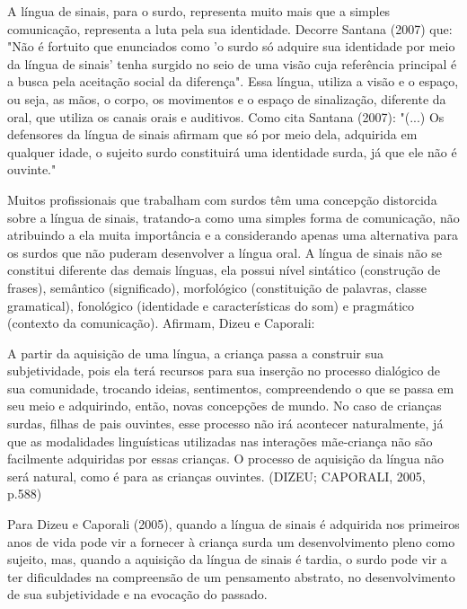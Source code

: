 \documentclass[brasil]{abnt}
\begin{document}
		A língua de sinais, para o surdo, representa muito mais que a simples comunicação, representa a luta pela sua identidade. Decorre Santana (2007) que: "Não é fortuito que enunciados como 
		'o surdo só adquire sua identidade por meio da língua de sinais' tenha surgido no seio de uma visão cuja referência principal é a busca pela aceitação social da diferença". Essa língua, 
		utiliza a visão e o espaço, ou seja, as mãos, o corpo, os movimentos e o espaço de sinalização, diferente da oral, que utiliza os canais orais e auditivos. Como cita Santana (2007): "(...) Os 
		defensores da língua de sinais afirmam que só por meio dela, adquirida em qualquer idade, o sujeito surdo constituirá uma identidade surda, já que ele não é ouvinte."
			
		Muitos profissionais que trabalham com surdos têm uma concepção distorcida sobre a língua de sinais, tratando-a como uma simples forma de comunicação, não atribuindo a ela muita importância e a 
		considerando apenas uma alternativa para os surdos que não puderam desenvolver a língua oral. A língua de sinais não se constitui diferente das demais línguas, ela possui nível sintático 
		(construção de frases), semântico (significado), morfológico (constituição de palavras, classe gramatical), fonológico (identidade e características do som) e pragmático (contexto da comunicação). 
		Afirmam, Dizeu e Caporali:
			
				\begin{citacao}A partir da aquisição de uma língua, a criança passa a construir sua subjetividade, pois ela terá recursos para sua inserção no processo dialógico de sua comunidade, trocando 
								ideias, sentimentos, compreendendo o que se passa em seu meio e adquirindo, então, novas concepções de mundo. No caso de crianças surdas, filhas de pais ouvintes, esse processo 
								não irá acontecer naturalmente, já que as modalidades linguísticas utilizadas nas interações mãe-criança não são facilmente adquiridas por essas crianças. O processo de 
								aquisição da língua não será natural, como é para as crianças ouvintes. (DIZEU; CAPORALI, 2005, p.588)
				\end{citacao}
					
		Para Dizeu e Caporali (2005), quando a língua de sinais é adquirida nos primeiros anos de vida pode vir a fornecer à criança surda um desenvolvimento pleno como sujeito, mas, quando a aquisição da 
		língua de sinais é tardia, o surdo pode vir a ter dificuldades na compreensão de um pensamento abstrato, no desenvolvimento de sua subjetividade e na evocação do passado.
					
\end{document}
